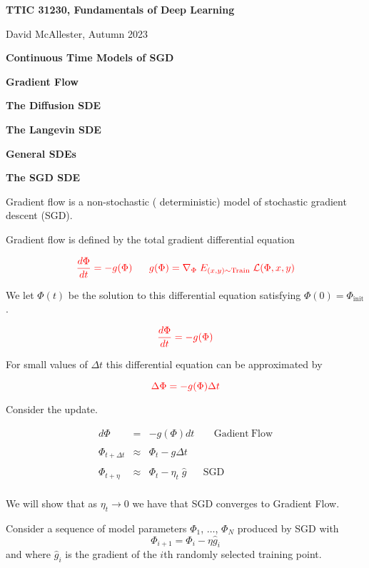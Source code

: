 




{\Huge

\centerline{\bf TTIC 31230, Fundamentals of Deep Learning}
\bigskip
\centerline{David McAllester, Autumn 2023}
\vfill
\centerline{\bf Continuous Time Models of SGD}
\vfill
\vfill
\centerline{\bf Gradient Flow}
\vfill
\centerline{\bf The Diffusion SDE}
\vfill
\centerline{\bf The Langevin SDE}
\vfill
\centerline{\bf General SDEs}
\vfill
\centerline{\bf The SGD SDE}


Gradient flow is a non-stochastic ({\color{red} deterministic}) model of {\color{red} stochastic} gradient descent (SGD).

\vfill
Gradient flow is defined by the {\color{red} total gradient} differential equation

$${\color{red} \frac{d \Phi}{d t} = - g(\Phi) \;\;\;\;\;\; g(\Phi) = \nabla_\Phi\; E_{(x,y) \sim \mathrm{Train}}\;{\cal L}(\Phi,x,y)}$$

\vfill
We let $\Phi(t)$ be the solution to this differential equation satisfying $\Phi(0) = \Phi_{\mathrm{init}}$.

$${\color{red} \frac{d \Phi}{d t} = - g(\Phi)}$$

\vfill
For small values of $\Delta t$ this differential equation can be approximated by

\vfill
$${\color{red} \Delta \Phi = - g(\Phi)\Delta t}$$


Consider the update.


\begin{eqnarray*}
d \Phi & = & - g(\Phi)dt \;\;\;\;\;\;\; \mathrm{Gadient~Flow} \\
\\
\Phi_{t+\Delta t} & \approx & \Phi_t - g\Delta t \\
\\
\Phi_{t+\eta} & \approx & \Phi_t - \eta_t\;\hat{g} \;\;\;\;\;\; \mathrm{SGD} \\
\end{eqnarray*}

We will show that as $\eta_t \rightarrow 0$ we have that SGD converges to Gradient Flow.

Consider a sequence of model parameters $\Phi_1$, $\ldots$, $\Phi_N$ produced by SGD with
$$\Phi_{i+1} = \Phi_i - \eta \hat{g}_i$$
and where $\hat{g}_i$ is the gradient of the $i$th randomly selected training point.

}
